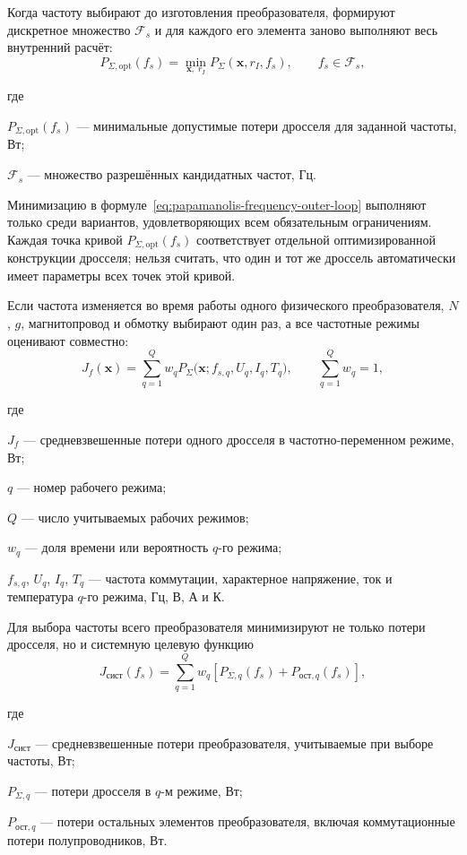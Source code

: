 \documentclass[14pt,a4paper]{extarticle}
\newenvironment{whereblock}
 {\par\noindent где\par
  \begin{list}{}{\setlength{\leftmargin}{12.5mm}
                  \setlength{\itemindent}{-12.5mm}
                  \setlength{\itemsep}{0pt}
                  \setlength{\parsep}{0pt}
                  \setlength{\topsep}{0pt}}}
 {\end{list}}
\newcommand{\whereitem}[2]{\item[] #1 --- #2}
\begin{document}
Когда частоту выбирают до изготовления преобразователя, формируют
дискретное множество $\mathcal F_s$ и для каждого его элемента заново
выполняют весь внутренний расчёт:
\begin{equation}
 P_{\Sigma,\text{opt}}(f_s)=
 \min_{\mathbf x,\;r_I}
 P_{\Sigma}(\mathbf x,r_I,f_s),
 \qquad f_s\in\mathcal F_s,
 \label{eq:papamanolis-frequency-outer-loop}
\end{equation}
\begin{whereblock}
\whereitem{$P_{\Sigma,\text{opt}}(f_s)$}{минимальные допустимые потери
дросселя для заданной частоты, Вт;}
\whereitem{$\mathcal F_s$}{множество разрешённых кандидатных частот, Гц.}
\end{whereblock}

Минимизацию в формуле~\eqref{eq:papamanolis-frequency-outer-loop}
выполняют только среди вариантов, удовлетворяющих всем обязательным
ограничениям. Каждая точка кривой
$P_{\Sigma,\text{opt}}(f_s)$ соответствует отдельной оптимизированной
конструкции дросселя; нельзя считать, что один и тот же дроссель
автоматически имеет параметры всех точек этой кривой.

Если частота изменяется во время работы одного физического
преобразователя, $N$, $g$, магнитопровод и обмотку выбирают один раз, а
все частотные режимы оценивают совместно:
\begin{equation}
 J_f(\mathbf x)=
 \sum_{q=1}^{Q}
 w_q P_{\Sigma}
 \bigl(\mathbf x;f_{s,q},U_q,I_q,T_q\bigr),
 \qquad
 \sum_{q=1}^{Q}w_q=1,
 \label{eq:variable-frequency-profile}
\end{equation}
\begin{whereblock}
\whereitem{$J_f$}{средневзвешенные потери одного дросселя в
частотно-переменном режиме, Вт;}
\whereitem{$q$}{номер рабочего режима;}
\whereitem{$Q$}{число учитываемых рабочих режимов;}
\whereitem{$w_q$}{доля времени или вероятность $q$-го режима;}
\whereitem{$f_{s,q}$, $U_q$, $I_q$, $T_q$}{частота коммутации,
характерное напряжение, ток и температура $q$-го режима, Гц, В, А и К.}
\end{whereblock}

Для выбора частоты всего преобразователя минимизируют не только потери
дросселя, но и системную целевую функцию
\begin{equation}
 J_{\text{сист}}(f_s)=
 \sum_{q=1}^{Q}w_q
 \left[
 P_{\Sigma,q}(f_s)+P_{\text{ост},q}(f_s)
 \right],
 \label{eq:system-frequency-objective}
\end{equation}
\begin{whereblock}
\whereitem{$J_{\text{сист}}$}{средневзвешенные потери преобразователя,
учитываемые при выборе частоты, Вт;}
\whereitem{$P_{\Sigma,q}$}{потери дросселя в $q$-м режиме, Вт;}
\whereitem{$P_{\text{ост},q}$}{потери остальных элементов
преобразователя, включая коммутационные потери полупроводников, Вт.}
\end{whereblock}
\end{document}
